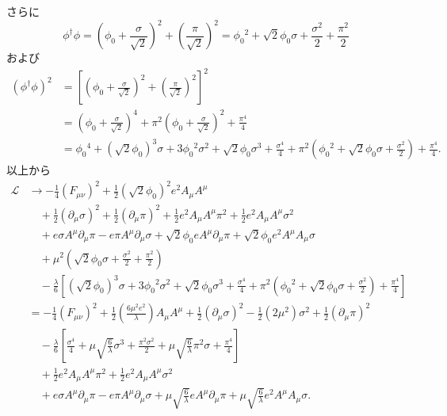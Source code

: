 さらに
\[
\phi^\dagger \phi
= \left( \phi_0 + \frac{\sigma}{\sqrt{2}} \right)^2 + \left( \frac{\pi}{\sqrt{2}} \right)^2
= \phi_0{}^2 + \sqrt{2} \phi_0 \sigma + \frac{\sigma^2}{2} + \frac{\pi^2}{2}
\]
および
\begin{align*}
  (\phi^\dagger \phi)^2 &= \left[ \left( \phi_0 + \frac{\sigma}{\sqrt{2}} \right)^2 + \left( \frac{\pi}{\sqrt{2}} \right)^2 \right]^2 \\
  &= \left( \phi_0 + \frac{\sigma}{\sqrt{2}} \right)^4 + \pi^2 \left( \phi_0 + \frac{\sigma}{\sqrt{2}} \right)^2 + \frac{\pi^4}{4} \\
  &= \phi_0{}^4 + (\sqrt{2}\phi_0)^3 \sigma + 3 \phi_0{}^2 \sigma^2 + \sqrt{2} \phi_0 \sigma^3 + \frac{\sigma^4}{4}
  + \pi^2 \left( \phi_0{}^2 + \sqrt{2} \phi_0 \sigma + \frac{\sigma^2}{2} \right) + \frac{\pi^4}{4} .
\end{align*}
以上から
\begin{align*}
  \mathcal{L}
  &\to - \frac{1}{4} (F_{\mu\nu})^2 + \frac{1}{2} (\sqrt{2}\phi_0)^2 e^2 A_\mu A^\mu \\
  &\quad + \frac{1}{2} (\partial_\mu\sigma)^2 + \frac{1}{2} (\partial_\mu\pi)^2
  + \frac{1}{2} e^2 A_\mu A^\mu \pi^2 + \frac{1}{2} e^2 A_\mu A^\mu \sigma^2 \\
  &\quad + e \sigma A^\mu \partial_\mu\pi - e \pi A^\mu \partial_\mu\sigma
  + \sqrt{2} \phi_0 e A^\mu \partial_\mu\pi + \sqrt{2} \phi_0 e^2 A^\mu A_\mu \sigma \\
  &\quad + \mu^2 \left( \sqrt{2} \phi_0 \sigma + \frac{\sigma^2}{2} + \frac{\pi^2}{2} \right) \\
  &\quad - \frac{\lambda}{6} \left[ (\sqrt{2}\phi_0)^3 \sigma + 3 \phi_0{}^2 \sigma^2 + \sqrt{2} \phi_0 \sigma^3 + \frac{\sigma^4}{4}
  + \pi^2 \left( \phi_0{}^2 + \sqrt{2} \phi_0 \sigma + \frac{\sigma^2}{2} \right) + \frac{\pi^4}{4} \right] \\
  &= - \frac{1}{4} (F_{\mu\nu})^2 + \frac{1}{2} \left( \frac{6\mu^2e^2}{\lambda} \right) A_\mu A^\mu
  + \frac{1}{2} (\partial_\mu\sigma)^2 - \frac{1}{2} (2\mu^2) \sigma^2 + \frac{1}{2} (\partial_\mu\pi)^2  \\
  &\quad - \frac{\lambda}{6} \left[ \frac{\sigma^4}{4} + \mu \sqrt{\frac{6}{\lambda}} \sigma^3
  + \frac{\pi^2\sigma^2}{2} + \mu \sqrt{\frac{6}{\lambda}} \pi^2 \sigma + \frac{\pi^4}{4} \right] \\
  &\quad + \frac{1}{2} e^2 A_\mu A^\mu \pi^2 + \frac{1}{2} e^2 A_\mu A^\mu \sigma^2 \\
  &\quad + e \sigma A^\mu \partial_\mu\pi - e \pi A^\mu \partial_\mu\sigma
  + \mu \sqrt{\frac{6}{\lambda}} e A^\mu \partial_\mu\pi + \mu \sqrt{\frac{6}{\lambda}} e^2 A^\mu A_\mu \sigma .
\end{align*}
